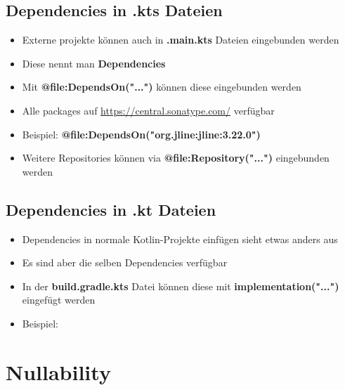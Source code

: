     \subsection{Dependencies in \textbf{.kts} Dateien}\label{subsec:dependencies-in-kts-dateien}
    \begin{frame}[c]
        \slidehead
        \begin{itemize}
            [<+->]
            \item Externe projekte können auch in \textbf{.main.kts} Dateien eingebunden werden
            \item Diese nennt man \textbf{Dependencies}
            \item Mit \textbf{@file:DependsOn("...")} können diese eingebunden werden
            \item Alle packages auf \url{https://central.sonatype.com/} verfügbar
            \item Beispiel: \textbf{@file:DependsOn("org.jline:jline:3.22.0")}
            \item Weitere Repositories können via \textbf{@file:Repository("...")} eingebunden werden
        \end{itemize}
    \end{frame}

    \livecoding

    \subsection{Dependencies in \textbf{.kt} Dateien}\label{subsec:dependencies-in-kt-dateien}
    \begin{frame}[c]
        \slidehead
        \begin{itemize}
            [<+->]
            \item Dependencies in normale Kotlin-Projekte einfügen sieht etwas anders aus
            \item Es sind aber die selben Dependencies verfügbar
            \item In der \textbf{build.gradle.kts} Datei können diese mit \textbf{implementation("...")} eingefügt werden
            \item Beispiel:
        \end{itemize}
    \end{frame}

    \livecoding


    \section{Nullability}\label{sec:nullability}

